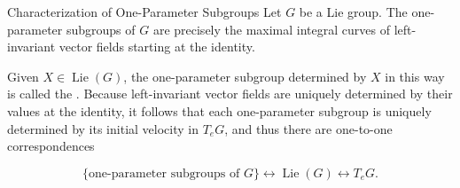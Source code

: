 \documentclass[../main.tex]{subfiles}
\begin{document}
\begin{theorem}{Characterization of One-Parameter Subgroups}{}
Let \(G\) be a Lie group. The one-parameter subgroups of \(G\) are precisely the maximal integral curves of left-invariant vector fields starting at the identity.
\end{theorem}


\begin{remark}
    Given \(X\in\operatorname{Lie}(G)\), the one-parameter subgroup determined by \(X\) in this way is called the . Because left-invariant vector fields are uniquely determined by their values at the identity, it follows that each one-parameter subgroup is uniquely determined by its initial velocity in \(T_eG\), and thus there are one-to-one correspondences

\[
\{\text{one-parameter subgroups of }G\}\longleftrightarrow\operatorname{Lie}(G)\longleftrightarrow T_eG.
\]
\end{remark}
\end{document}
